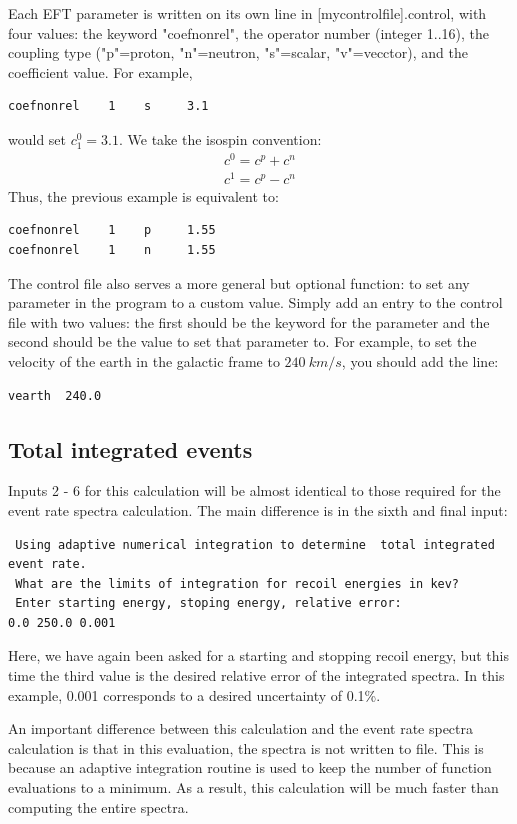 \documentclass[12pt]{article}
\begin{document}
Each EFT parameter is written on its own line in [mycontrolfile].control, with
four values: the keyword "coefnonrel", the operator number (integer 1..16), the
coupling type ("p"=proton, "n"=neutron, "s"=scalar, "v"=vecctor), and the
coefficient value. For example, 
\begin{verbatim}
coefnonrel    1    s     3.1
\end{verbatim}
would set $c_1^0 = 3.1$. We take the isospin convention:
\begin{equation}
	\begin{split}
		c^0 = c^p + c^n\\
		c^1 = c^p - c^n
	\end{split}
\end{equation}
Thus, the previous example is equivalent to:
\begin{verbatim}
coefnonrel    1    p     1.55
coefnonrel    1    n     1.55
\end{verbatim}

The control file also serves a more general but optional function: to set any 
parameter in the program to a custom value.  
Simply add an entry to the control file with two values: the first 
should be the keyword for the parameter and the 
second should be the value to set that parameter to. For example, to set the 
velocity of the earth in the galactic frame to $240\ km/s$, you should add the line:
\begin{verbatim}
vearth  240.0
\end{verbatim}

\subsection{Total integrated events}
Inputs 2 - 6 for this calculation will be almost identical to those required for
the event rate spectra calculation. The main difference is in the sixth and
final input:
\begin{verbatim}
 Using adaptive numerical integration to determine  total integrated event rate.
 What are the limits of integration for recoil energies in kev?
 Enter starting energy, stoping energy, relative error:
0.0 250.0 0.001
\end{verbatim}
Here, we have again been asked for a starting and stopping recoil energy, but
this time the third value is the desired relative error of the integrated
spectra. In this example, 0.001 corresponds to a desired uncertainty of 0.1\%. 

An important difference between this calculation and the event rate spectra
calculation is that in this evaluation, the spectra is not written to file. This
is because an adaptive integration routine is used to keep the number of
function evaluations to a minimum. As a result, this calculation will be much
faster than computing the entire spectra.
\end{document}
